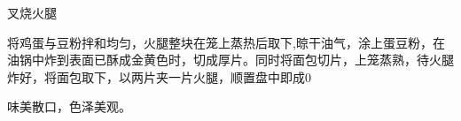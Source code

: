 \begin{recipe}{叉烧火腿}

\ingredients


\cooking

将鸡蛋与豆粉拌和均匀，火腿整块在笼上蒸热后取下,晾干油气，涂上蛋豆粉，在油锅中炸到表面已酥成金黄色时，切成厚片。同时将面包切片，上笼蒸熟，待火腿炸好，将面包取下，以两片夹一片火腿，顺置盘中即成0

\notes

味美散口，色泽美观。

\end{recipe}


